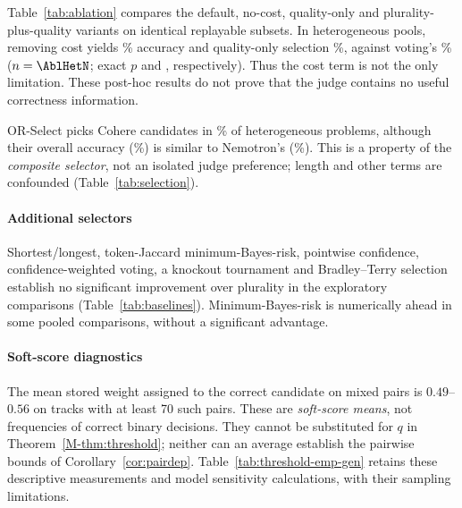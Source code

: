Table~\ref{tab:ablation} compares the default, no-cost, quality-only and
plurality-plus-quality variants on identical replayable subsets. In
heterogeneous pools, removing cost yields \AblHetNoCostAcc\% accuracy and
quality-only selection \AblHetQOnlyAcc\%, against voting's
\AblHetSCAcc\% ($n=\AblHetN$; exact $p$ \AblHetNoCostP{} and
\AblHetQOnlyP{}, respectively). Thus the cost term is not the only
limitation. These post-hoc results do not prove that the judge contains
no useful correctness information.

OR-Select picks Cohere candidates in \PickShareCohere\% of heterogeneous
problems, although their overall accuracy (\CandAccCohere\%) is similar to
Nemotron's (\CandAccNemotron\%). This is a property of the \emph{composite
selector}, not an isolated judge preference; length and other terms are
confounded (Table~\ref{tab:selection}).

\begin{table}[htbp]
\centering
\caption{Offline replay of the selection step on stored judge outputs
(accuracy \%, problems whose judge outputs were stored). SC: stored
self-consistency result on the same problems.}
\label{tab:ablation}
\small\setlength{\tabcolsep}{4pt}
\end{table}

\paragraph{Additional selectors}
\label{sec:baselines}

Shortest/longest, token-Jaccard minimum-Bayes-risk, pointwise confidence,
confidence-weighted voting, a knockout tournament and Bradley--Terry
selection establish no significant improvement over plurality in the
exploratory comparisons (Table~\ref{tab:baselines}). Minimum-Bayes-risk
is numerically ahead in some pooled comparisons, without a significant advantage.

\paragraph{Soft-score diagnostics}
\label{sec:threshold-results}

The mean stored weight assigned to the correct candidate on mixed pairs
is $0.49$--$0.56$ on tracks with at least 70 such pairs. These are
\emph{soft-score means}, not frequencies of correct binary decisions.
They cannot be substituted for $q$ in Theorem~\ref{M-thm:threshold}; neither
can an average establish the pairwise bounds of Corollary~\ref{cor:pairdep}.
Table~\ref{tab:threshold-emp-gen} retains these descriptive measurements
and model sensitivity calculations, with their sampling limitations.


